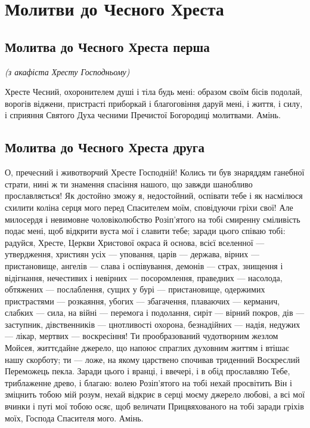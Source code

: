 \documentclass[chapters.tex]{subfiles}
\begin{document}
\chapter{Молитви до Чесного Хреста}
\section{Молитва до Чесного Хреста перша}
\emph{(з акафіста Хресту Господньому)}

Хресте Чесний, охоронителем душі і тіла будь мені: образом своїм бісів подолай, ворогів віджени, пристрасті приборкай і благоговіння даруй мені, і життя, і силу, і сприяння Святого Духа чесними Пречистої Богородиці молитвами. Амінь.

\section{Молитва до Чесного Хреста друга}
О, пречесний і животворчий Хресте Господній! Колись ти був знаряддям ганебної страти, нині ж ти знамення спасіння нашого, що завжди шанобливо прославляється! Як достойно зможу я, недостойний, оспівати тебе і як насмілюся схилити коліна серця мого перед Спасителем моїм, сповідуючи гріхи свої! Але милосердя і невимовне чоловіколюбство Розіп’ятого на тобі смиренну сміливість подає мені, щоб відкрити вуста мої і славити тебе; заради цього співаю тобі: радуйся, Хресте, Церкви Христової окраса й основа, всієї вселенної — утвердження, християн усіх — уповання, царів — держава, вірних — пристановище, ангелів — слава і оспівування, демонів — страх, знищення і відігнання, нечестивих і невірних — посоромлення, праведних — насолода, обтяжених — послаблення, сущих у бурі — пристановище, одержимих пристрастями — розкаяння, убогих — збагачення, плаваючих — керманич, слабких — сила, на війні — перемога і подолання, сиріт — вірний покров, дів — заступник, дівственників — цнотливості охорона, безнадійних — надія, недужих — лікар, мертвих — воскресіння! Ти прообразований чудотворним жезлом Мойсея, життєдайне джерело, що напоює спраглих духовним життям і втішає нашу скорботу; ти — ложе, на якому царствено спочивав триденний Воскреслий Переможець пекла. Заради цього і вранці, і ввечері, і в обід прославляю Тебе, триблаженне древо, і благаю: волею Розіп’ятого на тобі нехай просвітить Він і зміцнить тобою мій розум, нехай відкриє в серці моєму джерело любові, а всі мої вчинки і путі мої тобою осяє, щоб величати Прицвяхованого на тобі заради гріхів моїх, Господа Спасителя мого. Амінь.
\end{document}
